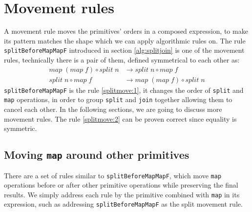 \documentclass{l4proj}
\begin{document}
\section{Movement rules}
\label{sec:move}
A movement rule moves the primitives' orders in a composed expression, to make its pattern matches the shape which we can apply algorithmic rules on. The rule \texttt{splitBeforeMapMapF} introduced in section \ref{alg:splitjoin} is one of the movement rules, technically there is a pair of them, defined symmetrical to each other as:
\begin{align}
    \label{splitmove:1}
    map\;(map\; f) \circ split\; n &\to split\; n \circ map\; f \\
    \label{splitmove:2}
    split\; n \circ map\; f &\to map\;(map\; f) \circ split\; n
\end{align}
\texttt{splitBeforeMapMapF} is the rule \ref{splitmove:1}, it changes the order of \texttt{split} and \texttt{map} operations, in order to group \texttt{split} and \texttt{join} together allowing them to cancel each other. In the following sections, we are going to discuss more movement rules. The rule \ref{splitmove:2} can be proven correct since equality is symmetric.

\subsection{Moving \texttt{map} around other primitives}
\label{move:map}
There are a set of rules similar to \texttt{splitBeforeMapMapF}, which move \texttt{map} operations before or after other primitive operations while preserving the final results. We simply address each rule by the primitive combined with \texttt{map} in its expression, such as addressing \texttt{splitBeforeMapMapF} as the split movement rule.
\end{document}
